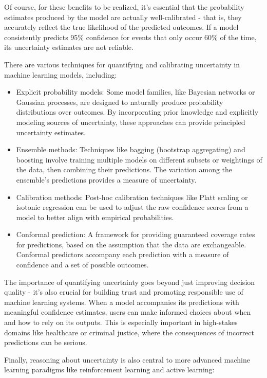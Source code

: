 \documentclass[
  9pt,
  letterpaper,
  abstract,
  titlepage]{scrbook}
\begin{document}
Of course, for these benefits to be realized, it's essential that the
probability estimates produced by the model are actually well-calibrated
- that is, they accurately reflect the true likelihood of the predicted
outcomes. If a model consistently predicts 95\% confidence for events
that only occur 60\% of the time, its uncertainty estimates are not
reliable.

There are various techniques for quantifying and calibrating uncertainty
in machine learning models, including:

\begin{itemize}
\item
  Explicit probability models: Some model families, like Bayesian
  networks or Gaussian processes, are designed to naturally produce
  probability distributions over outcomes. By incorporating prior
  knowledge and explicitly modeling sources of uncertainty, these
  approaches can provide principled uncertainty estimates.
\item
  Ensemble methods: Techniques like bagging (bootstrap aggregating) and
  boosting involve training multiple models on different subsets or
  weightings of the data, then combining their predictions. The
  variation among the ensemble's predictions provides a measure of
  uncertainty.
\item
  Calibration methods: Post-hoc calibration techniques like Platt
  scaling or isotonic regression can be used to adjust the raw
  confidence scores from a model to better align with empirical
  probabilities.
\item
  Conformal prediction: A framework for providing guaranteed coverage
  rates for predictions, based on the assumption that the data are
  exchangeable. Conformal predictors accompany each prediction with a
  measure of confidence and a set of possible outcomes.
\end{itemize}

The importance of quantifying uncertainty goes beyond just improving
decision quality - it's also crucial for building trust and promoting
responsible use of machine learning systems. When a model accompanies
its predictions with meaningful confidence estimates, users can make
informed choices about when and how to rely on its outputs. This is
especially important in high-stakes domains like healthcare or criminal
justice, where the consequences of incorrect predictions can be serious.

Finally, reasoning about uncertainty is also central to more advanced
machine learning paradigms like reinforcement learning and active
learning:
\end{document}
